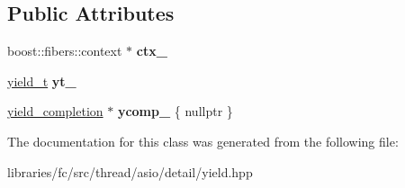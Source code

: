 \subsection*{Public Attributes}
\begin{DoxyCompactItemize}
\item 
\mbox{\label{classboost_1_1fibers_1_1asio_1_1detail_1_1yield__handler__base_a08d9217895e8f36500a1b9a8700728f5}} 
boost\+::fibers\+::context $\ast$ {\bfseries ctx\+\_\+}
\item 
\mbox{\label{classboost_1_1fibers_1_1asio_1_1detail_1_1yield__handler__base_ad31017b9fed6d3b631f6525539586003}} 
\mbox{\hyperlink{classboost_1_1fibers_1_1asio_1_1yield__t}{yield\+\_\+t}} {\bfseries yt\+\_\+}
\item 
\mbox{\label{classboost_1_1fibers_1_1asio_1_1detail_1_1yield__handler__base_a38b1a97a293fabe58dfd1815d26ddb2a}} 
\mbox{\hyperlink{structboost_1_1fibers_1_1asio_1_1detail_1_1yield__completion}{yield\+\_\+completion}} $\ast$ {\bfseries ycomp\+\_\+} \{ nullptr \}
\end{DoxyCompactItemize}


The documentation for this class was generated from the following file\+:\begin{DoxyCompactItemize}
\item 
libraries/fc/src/thread/asio/detail/yield.\+hpp\end{DoxyCompactItemize}
